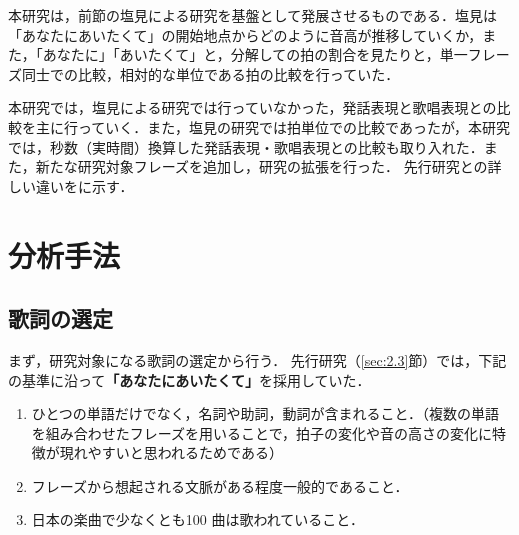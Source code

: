 本研究は，前節の塩見による研究を基盤として発展させるものである．塩見は「あなたにあいたくて」の開始地点からどのように音高が推移していくか，また，「あなたに」「あいたくて」と，分解しての拍の割合を見たりと，単一フレーズ同士での比較，相対的な単位である拍の比較を行っていた．\par
本研究では，塩見による研究では行っていなかった，発話表現と歌唱表現との比較を主に行っていく．また，塩見の研究では拍単位での比較であったが，本研究では，秒数（実時間）換算した発話表現・歌唱表現との比較も取り入れた．また，新たな研究対象フレーズを追加し，研究の拡張を行った．
先行研究との詳しい違いをに示す．


\begin{table}[t]
  \centering
  \scriptsize
  \caption{先行研究との違い}
  
  \label{tab:tigai}
\end{table}

\section{分析手法}

\subsection{歌詞の選定}\label{sec:3.2}

まず，研究対象になる歌詞の選定から行う．
先行研究（\ref{sec:2.3}節）では，下記の基準に沿って\textbf{「あなたにあいたくて」}を採用していた．

\begin{enumerate}
  \renewcommand{\labelenumi}{\arabic{enumi})}
  \item ひとつの単語だけでなく，名詞や助詞，動詞が含まれること．（複数の単語を組み合わせたフレーズを用いることで，拍子の変化や音の高さの変化に特徴が現れやすいと思われるためである）
  \item フレーズから想起される文脈がある程度一般的であること．
  \item 日本の楽曲で少なくとも100 曲は歌われていること．
\end{enumerate}


